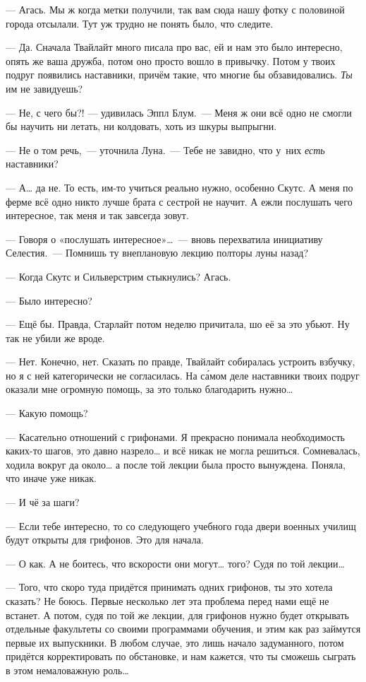 \documentclass[fontsize=11pt,a5paper,titlepage=firstcover]{scrbook}
\begin{document}
--- Агась. Мы ж когда метки получили, так вам сюда нашу фотку с половиной города отсылали. Тут уж трудно не понять было, что следите.

--- Да. Сначала Твайлайт много писала про вас, ей и нам это было интересно, опять же ваша дружба, потом оно просто вошло в привычку. Потом у твоих подруг появились наставники, причём такие, что многие бы обзавидовались. \emph{Ты} им не завидуешь?

--- Не, с чего бы?! --- удивилась Эппл Блум.~--- Меня ж они всё одно не смогли бы научить ни летать, ни колдовать, хоть из шкуры выпрыгни.

--- Не о том речь,~--- уточнила Луна.~--- Тебе не завидно, что у~них \emph{есть} наставники?

--- А{\ldots} да не. То есть, им-то учиться реально нужно, особенно Скутс. А меня по ферме всё одно никто лучше брата с сестрой не научит. А ежли послушать чего интересное, так меня и так завсегда зовут.

--- Говоря о «послушать интересное»{\ldots}~--- вновь перехватила инициативу Селестия.~--- Помнишь ту внеплановую лекцию полторы луны назад?

--- Когда Скутс и Сильверстрим стыкнулись? Агась.

--- Было интересно?

--- Ещё бы. Правда, Старлайт потом неделю причитала, шо её за это убьют. Ну так не убили же вроде.

--- Нет. Конечно, нет. Сказать по правде, Твайлайт собиралась устроить взбучку, но я с ней категорически не согласилась. На са́мом деле наставники твоих подруг оказали мне огромную помощь, за это только благодарить нужно{\ldots}

--- Какую помощь?

--- Касательно отношений с грифонами. Я прекрасно понимала необходимость каких-то шагов, это давно назрело{\ldots} и всё никак не могла решиться. Сомневалась, ходила вокруг да около{\ldots} а после той лекции была просто вынуждена. Поняла, что иначе уже никак.

--- И чё за шаги?

--- Если тебе интересно, то со следующего учебного года двери военных училищ будут открыты для грифонов. Это для начала.

--- О как. А не боитесь, что вскорости они могут{\ldots} того? Судя по той лекции{\ldots}

--- Того, что скоро туда придётся принимать одних грифонов, ты это хотела сказать? Не боюсь. Первые несколько лет эта проблема перед нами ещё не встанет. А потом, судя по той же лекции, для грифонов нужно будет открывать отдельные факультеты со своими программами обучения, и этим как раз займутся первые их выпускники. В любом случае, это лишь начало задуманного, потом придётся корректировать по обстановке, и нам кажется, что ты сможешь сыграть в этом немаловажную роль{\ldots}
\end{document}
